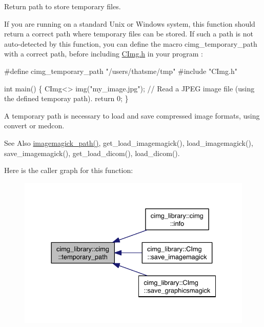 Return path to store temporary files. 

If you are running on a standard Unix or Windows system, this function should return a correct path where temporary files can be stored. If such a path is not auto-\/detected by this function, you can define the macro {\ttfamily cimg\-\_\-temporary\-\_\-path} with a correct path, before including {\ttfamily \hyperlink{_c_img_8h_source}{C\-Img.\-h}} in your program \-: 
\begin{DoxyCode}
\textcolor{preprocessor}{#define cimg\_temporary\_path "/users/thatsme/tmp"}
\textcolor{preprocessor}{}\textcolor{preprocessor}{#include "CImg.h"}

\textcolor{keywordtype}{int} main() \{
  CImg<> img(\textcolor{stringliteral}{"my\_image.jpg"});   \textcolor{comment}{// Read a JPEG image file (using the defined temporay path).}
  \textcolor{keywordflow}{return} 0;
\}
\end{DoxyCode}


A temporary path is necessary to load and save compressed image formats, using {\ttfamily convert} or {\ttfamily medcon}.

\begin{DoxySeeAlso}{See Also}
\hyperlink{namespacecimg__library_1_1cimg_a66b97c48fa2e598dd3818152cca7e4f0}{imagemagick\-\_\-path()}, get\-\_\-load\-\_\-imagemagick(), load\-\_\-imagemagick(), save\-\_\-imagemagick(), get\-\_\-load\-\_\-dicom(), load\-\_\-dicom(). 
\end{DoxySeeAlso}


Here is the caller graph for this function\-:
\nopagebreak
\begin{figure}[H]
\begin{center}
\leavevmode
\includegraphics[width=332pt]{namespacecimg__library_1_1cimg_a411c598d6a44291415a1e2299d2c39b1_icgraph}
\end{center}
\end{figure}


